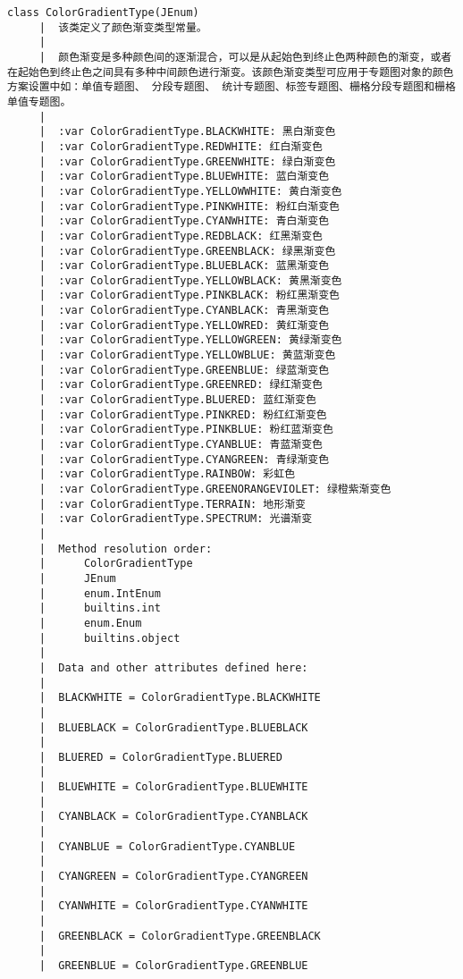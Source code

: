 \documentclass[11pt]{article}
\begin{document}
\begin{Verbatim}[commandchars=\\\{\}]
    class ColorGradientType(JEnum)
     |  该类定义了颜色渐变类型常量。
     |  
     |  颜色渐变是多种颜色间的逐渐混合，可以是从起始色到终止色两种颜色的渐变，或者在起始色到终止色之间具有多种中间颜色进行渐变。该颜色渐变类型可应用于专题图对象的颜色方案设置中如：单值专题图、 分段专题图、 统计专题图、标签专题图、栅格分段专题图和栅格单值专题图。
     |  
     |  :var ColorGradientType.BLACKWHITE: 黑白渐变色
     |  :var ColorGradientType.REDWHITE: 红白渐变色
     |  :var ColorGradientType.GREENWHITE: 绿白渐变色
     |  :var ColorGradientType.BLUEWHITE: 蓝白渐变色
     |  :var ColorGradientType.YELLOWWHITE: 黄白渐变色
     |  :var ColorGradientType.PINKWHITE: 粉红白渐变色
     |  :var ColorGradientType.CYANWHITE: 青白渐变色
     |  :var ColorGradientType.REDBLACK: 红黑渐变色
     |  :var ColorGradientType.GREENBLACK: 绿黑渐变色
     |  :var ColorGradientType.BLUEBLACK: 蓝黑渐变色
     |  :var ColorGradientType.YELLOWBLACK: 黄黑渐变色
     |  :var ColorGradientType.PINKBLACK: 粉红黑渐变色
     |  :var ColorGradientType.CYANBLACK: 青黑渐变色
     |  :var ColorGradientType.YELLOWRED: 黄红渐变色
     |  :var ColorGradientType.YELLOWGREEN: 黄绿渐变色
     |  :var ColorGradientType.YELLOWBLUE: 黄蓝渐变色
     |  :var ColorGradientType.GREENBLUE: 绿蓝渐变色
     |  :var ColorGradientType.GREENRED: 绿红渐变色
     |  :var ColorGradientType.BLUERED: 蓝红渐变色
     |  :var ColorGradientType.PINKRED: 粉红红渐变色
     |  :var ColorGradientType.PINKBLUE: 粉红蓝渐变色
     |  :var ColorGradientType.CYANBLUE: 青蓝渐变色
     |  :var ColorGradientType.CYANGREEN: 青绿渐变色
     |  :var ColorGradientType.RAINBOW: 彩虹色
     |  :var ColorGradientType.GREENORANGEVIOLET: 绿橙紫渐变色
     |  :var ColorGradientType.TERRAIN: 地形渐变
     |  :var ColorGradientType.SPECTRUM: 光谱渐变
     |  
     |  Method resolution order:
     |      ColorGradientType
     |      JEnum
     |      enum.IntEnum
     |      builtins.int
     |      enum.Enum
     |      builtins.object
     |  
     |  Data and other attributes defined here:
     |  
     |  BLACKWHITE = ColorGradientType.BLACKWHITE
     |  
     |  BLUEBLACK = ColorGradientType.BLUEBLACK
     |  
     |  BLUERED = ColorGradientType.BLUERED
     |  
     |  BLUEWHITE = ColorGradientType.BLUEWHITE
     |  
     |  CYANBLACK = ColorGradientType.CYANBLACK
     |  
     |  CYANBLUE = ColorGradientType.CYANBLUE
     |  
     |  CYANGREEN = ColorGradientType.CYANGREEN
     |  
     |  CYANWHITE = ColorGradientType.CYANWHITE
     |  
     |  GREENBLACK = ColorGradientType.GREENBLACK
     |  
     |  GREENBLUE = ColorGradientType.GREENBLUE

\end{Verbatim}
\end{document}

